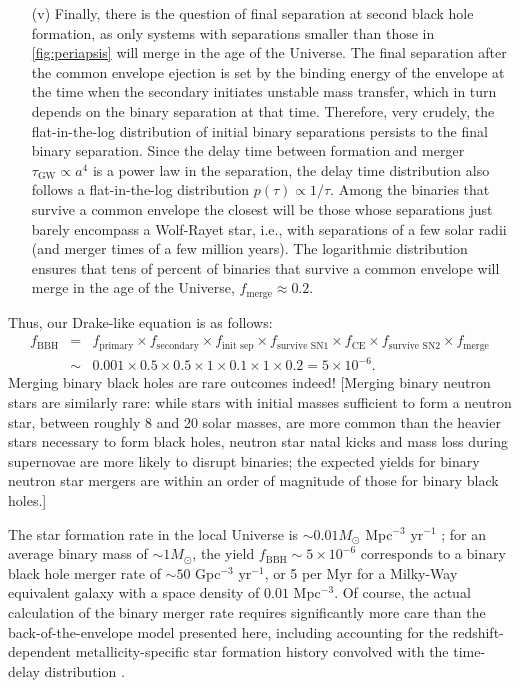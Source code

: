 \documentclass[review]{elsarticle}
\begin{document}
\begin{enumerate}
\item[(v)]  Finally, there is the question of final separation at second black hole formation, as only systems with separations smaller than those in \autoref{fig:periapsis} will merge in the age of the Universe.  The final separation after the common envelope ejection is set by the binding energy of the envelope at the time when the secondary initiates unstable mass transfer, which in turn depends on the binary separation at that time.  Therefore, very crudely, the flat-in-the-log distribution of initial binary separations persists to the final binary separation.  Since the delay time between formation and merger $\tau_\textrm{GW} \propto a^4$ is a power law in the separation, the delay time distribution also follows a flat-in-the-log distribution $p(\tau) \propto 1/\tau$.  Among the binaries that survive a common envelope the closest will be those whose separations just barely encompass a Wolf-Rayet star, i.e., with separations of a few solar radii (and merger times of a few million years).  The logarithmic distribution ensures that tens of percent of binaries that survive a common envelope will merge in the age of the Universe, $f_\textrm{merge} \approx 0.2$.
\end{enumerate}

Thus, our Drake-like equation is as follows:
\begin{eqnarray}
f_\textrm{BBH} &=& f_\textrm{primary} \times f_\textrm{secondary} \times f_\textrm{init sep} \times f_\textrm{survive SN1} \times f_\textrm{CE} \times f_\textrm{survive SN2} \times f_\textrm{merge} \nonumber \\
 & \sim & 0.001 \times 0.5 \times 0.5 \times 1 \times 0.1 \times 1 \times 0.2 = 5 \times 10^{-6}.
\end{eqnarray}
Merging binary black holes are rare outcomes indeed!  [Merging binary neutron stars are similarly rare: while stars with initial masses sufficient to form a neutron star, between roughly 8 and 20 solar masses, are more common than the heavier stars necessary to form black holes, neutron star natal kicks and mass loss during supernovae are more likely to disrupt binaries; the expected yields for binary neutron star mergers are within an order of magnitude of those for binary black holes.]

The star formation rate in the local Universe is $\sim 0.01 M_\odot$ Mpc$^{-3}$ yr$^{-1}$ \citep{MadauDickinson:2014}; for an average binary mass of $\sim 1 M_\odot$, the yield $f_\textrm{BBH} \sim 5 \times 10^{-6}$ corresponds to a binary black hole merger rate of $\sim 50$ Gpc$^{-3}$ yr$^{-1}$, or 5 per Myr for a Milky-Way equivalent galaxy with a space density of $0.01$ Mpc$^{-3}$.  Of course, the actual calculation of the binary merger rate requires significantly more care than the back-of-the-envelope model presented here, including accounting for the redshift-dependent metallicity-specific star formation history convolved with the time-delay distribution \citep{Belczynski:2010,Mapelli:2017,Klencki:2018,Chruslinska:2019,Neijssel:2019,ChruslinskaNelemans:2019,Tang:2020,Broekgaarden:2021,Santoliquido:2021}.  
\end{document}
